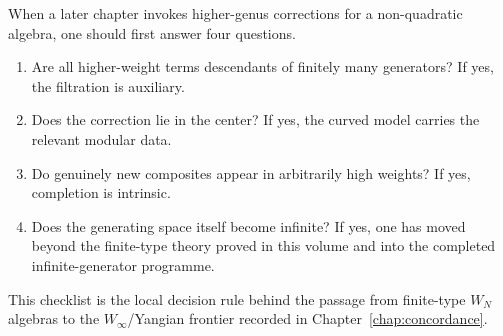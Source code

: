 \begin{remark}\label{rem:practitioner-takeaway-fc}
When a later chapter invokes higher-genus corrections for a non-quadratic
algebra, one should first answer four questions.
\begin{enumerate}
\item Are all higher-weight terms descendants of finitely many generators?
  If yes, the filtration is auxiliary.
\item Does the correction lie in the center?  If yes, the curved model carries
  the relevant modular data.
\item Do genuinely new composites appear in arbitrarily high weights?
  If yes, completion is intrinsic.
\item Does the generating space itself become infinite?  If yes, one has moved
  beyond the finite-type theory proved in this volume and into the completed
  infinite-generator programme.
\end{enumerate}
This checklist is the local decision rule behind the passage from finite-type
$W_N$ algebras to the $W_\infty$/Yangian frontier recorded in
Chapter~\ref{chap:concordance}.
\end{remark}
